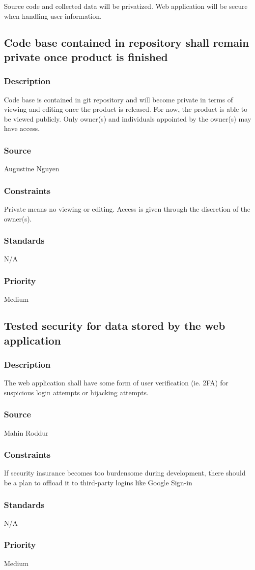 Source code and collected data will be privatized.  Web application will be secure when handling user information.

\subsection{Code base contained in repository shall remain private once product is finished}
\subsubsection{Description}
Code base is contained in git repository and will become private in terms of viewing and editing once the product is released.  For now, the product is able to be viewed publicly.  Only owner(s) and individuals appointed by the owner(s) may have access.
\subsubsection{Source}
Augustine Nguyen
\subsubsection{Constraints}
Private means no viewing or editing.  Access is given through the discretion of the owner(s).
\subsubsection{Standards}
N/A
\subsubsection{Priority}
Medium

\subsection{Tested security for data stored by the web application}
\subsubsection{Description}
The web application shall have some form of user verification (ie. 2FA) for suspicious login attempts or hijacking attempts. 
\subsubsection{Source}
Mahin Roddur
\subsubsection{Constraints}
If security insurance becomes too burdensome during development, there should be a plan to offload it to third-party logins like Google Sign-in
\subsubsection{Standards}
N/A
\subsubsection{Priority}
Medium
